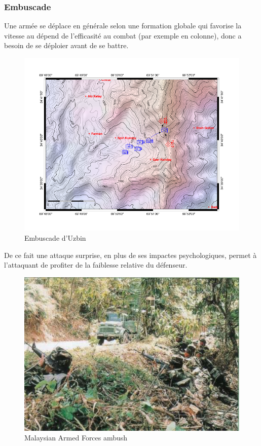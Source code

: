\documentclass{article}
\begin{document}
\subsubsection{Embuscade}
Une armée se déplace en générale selon une formation globale qui favorise la vitesse au dépend de l'efficasité au combat (par exemple en colonne), donc a besoin de se déploier avant de se battre.
\begin{figure}[H]
	\begin{centering}
	\includegraphics[width=\linewidth]{../ressources/Uzbin_valley_ambush-map}
	\caption{Embuscade d'Uzbin \cite{uzbin_ambush}}
	\end{centering}
\end{figure}
De ce fait une attaque surprise, en plus de ses impactes psychologiques, permet à l'attaquant de profiter de la faiblesse relative du défenseur.
\begin{figure}[H]
	\begin{centering}
	\includegraphics[width=0.8\linewidth]{../ressources/ambush}
	\caption{Malaysian Armed Forces ambush \cite{ambush_picture}}
	\end{centering}
\end{figure}
\cite{ambush_wiki}
\end{document}
